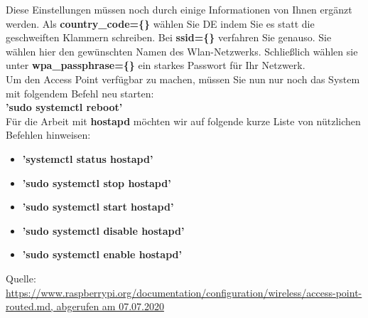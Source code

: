 \noindent Diese Einstellungen müssen noch durch einige Informationen von Ihnen ergänzt werden. Als \textbf{country\_code=\{\}} wählen Sie \glqq DE\grqq{} indem Sie es statt die geschweiften Klammern schreiben. Bei \textbf{ssid=\{\}} verfahren Sie genauso. Sie wählen hier den gewünschten Namen des Wlan-Netzwerks. Schließlich wählen sie unter \textbf{wpa\_passphrase=\{\}} ein starkes Passwort für Ihr Netzwerk.\\

\noindent Um den Access Point verfügbar zu machen, müssen Sie nun nur noch das System mit folgendem Befehl neu starten:\\

\textbf{’sudo systemctl reboot’}\\

\noindent Für die Arbeit mit \textbf{hostapd} möchten wir auf folgende kurze Liste von nützlichen Befehlen hinweisen:\\

\begin{itemize}
    \item \textbf{’systemctl status hostapd’}
    \item \textbf{’sudo systemctl stop hostapd’}
    \item \textbf{’sudo systemctl start hostapd’}
    \item \textbf{’sudo systemctl disable hostapd’}
    \item \textbf{’sudo systemctl enable hostapd’}
\end{itemize}

\noindent Quelle:\\

{\href{https://www.raspberrypi.org/documentation/configuration/wireless/access-point-routed.md} {https://www.raspberrypi.org/documentation/configuration/wireless/access-\indent point-routed.md, abgerufen am 07.07.2020}}